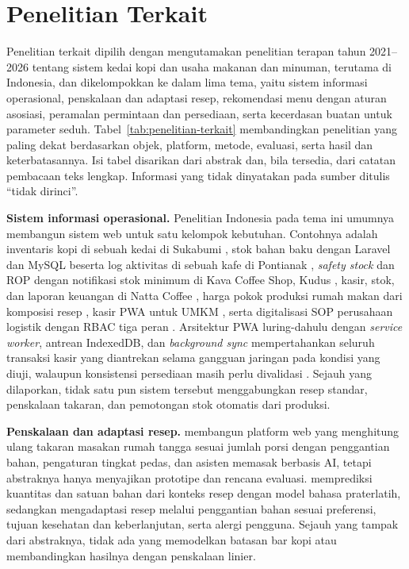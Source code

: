 \section{Penelitian Terkait}
\label{sec:penelitian-terkait}

Penelitian terkait dipilih dengan mengutamakan penelitian terapan tahun 2021--2026 tentang sistem kedai kopi dan usaha makanan dan minuman, terutama di Indonesia, dan dikelompokkan ke dalam lima tema, yaitu sistem informasi operasional, penskalaan dan adaptasi resep, rekomendasi menu dengan aturan asosiasi, peramalan permintaan dan persediaan, serta kecerdasan buatan untuk parameter seduh. Tabel~\ref{tab:penelitian-terkait} membandingkan penelitian yang paling dekat berdasarkan objek, platform, metode, evaluasi, serta hasil dan keterbatasannya. Isi tabel disarikan dari abstrak dan, bila tersedia, dari catatan pembacaan teks lengkap. Informasi yang tidak dinyatakan pada sumber ditulis ``tidak dirinci''.

\textbf{Sistem informasi operasional.} Penelitian Indonesia pada tema ini umumnya membangun sistem web untuk satu kelompok kebutuhan. Contohnya adalah inventaris kopi di sebuah kedai di Sukabumi \citep*{alifadillah2023web}, stok bahan baku dengan Laravel dan MySQL beserta log aktivitas di sebuah kafe di Pontianak \citep*{abdur2026sistem}, \textit{safety stock} dan ROP dengan notifikasi stok minimum di Kava Coffee Shop, Kudus \citep*{taufiq2025implementation}, kasir, stok, dan laporan keuangan di Natta Coffee \citep*{rusmara2025pengembangan}, harga pokok produksi rumah makan dari komposisi resep \citep*{kartono2025perancangan}, kasir PWA untuk UMKM \citep*{prayudha2024rancang}, serta digitalisasi SOP perusahaan logistik dengan RBAC tiga peran \citep*{shabrina2026sistem}. Arsitektur PWA luring-dahulu dengan \textit{service worker}, antrean IndexedDB, dan \textit{background sync} mempertahankan seluruh transaksi kasir yang diantrekan selama gangguan jaringan pada kondisi yang diuji, walaupun konsistensi persediaan masih perlu divalidasi \citep*{nugraha2026implementation}. Sejauh yang dilaporkan, tidak satu pun sistem tersebut menggabungkan resep standar, penskalaan takaran, dan pemotongan stok otomatis dari produksi.

\textbf{Penskalaan dan adaptasi resep.} \citet*{benita2026web} membangun platform web yang menghitung ulang takaran masakan rumah tangga sesuai jumlah porsi dengan penggantian bahan, pengaturan tingkat pedas, dan asisten memasak berbasis AI, tetapi abstraknya hanya menyajikan prototipe dan rencana evaluasi. \citet{choi2023kitchenscale} memprediksi kuantitas dan satuan bahan dari konteks resep dengan model bahasa praterlatih, sedangkan \citet*{moralesgarzon2025service} mengadaptasi resep melalui penggantian bahan sesuai preferensi, tujuan kesehatan dan keberlanjutan, serta alergi pengguna. Sejauh yang tampak dari abstraknya, tidak ada yang memodelkan batasan bar kopi atau membandingkan hasilnya dengan penskalaan linier.

